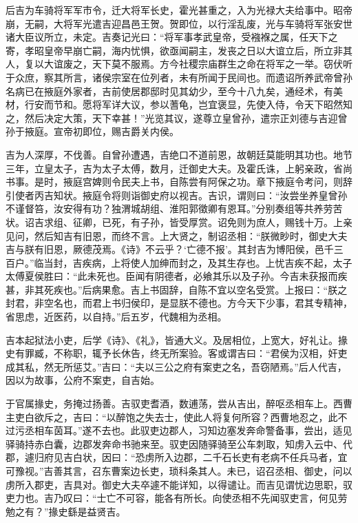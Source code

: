 \documentclass[12pt,UTF8]{ctexbook}
\begin{document}
后吉为车骑将军军市令，迁大将军长史，霍光甚重之，入为光禄大夫给事中。昭帝崩，无嗣，大将军光遣吉迎昌邑王贺。贺即位，以行淫乱废，光与车骑将军张安世诸大臣议所立，未定。吉奏记光曰：“将军事孝武皇帝，受襁褓之属，任天下之寄，孝昭皇帝早崩亡嗣，海内忧惧，欲亟闻嗣主，发丧之日以大谊立后，所立非其人，复以大谊废之，天下莫不服焉。方今社稷宗庙群生之命在将军之一举。窃伏听于众庶，察其所言，诸侯宗室在位列者，未有所闻于民间也。而遗诏所养武帝曾孙名病已在掖庭外家者，吉前使居郡邸时见其幼少，至今十八九矣，通经术，有美材，行安而节和。愿将军详大议，参以蓍龟，岂宜褒显，先使入侍，令天下昭然知之，然后决定大策，天下幸甚！”光览其议，遂尊立皇曾孙，遣宗正刘德与吉迎曾孙于掖庭。宣帝初即位，赐吉爵关内侯。



吉为人深厚，不伐善。自曾孙遭遇，吉绝口不道前恩，故朝廷莫能明其功也。地节三年，立皇太子，吉为太子太傅，数月，迁御史大夫。及霍氏诛，上躬亲政，省尚书事。是时，掖庭宫婢则令民夫上书，自陈尝有阿保之功。章下掖庭令考问，则辞引使者丙吉知状。掖庭令将则诣御史府以视吉。吉识，谓则曰：“汝尝坐养皇曾孙不谨督笞，汝安得有功？独渭城胡组、淮阳郭徵卿有恩耳。”分别奏组等共养劳苦状。诏吉求组、征卿，已死，有子孙，皆受厚赏。诏免则为庶人，赐钱十万。上亲见问，然后知吉有旧恩，而终不言。上大贤之，制诏丞相：“朕微眇时，御史大夫吉与朕有旧恩，厥德茂焉。《诗》不云乎？‘亡德不报’。其封吉为博阳侯，邑千三百户。”临当封，吉疾病，上将使人加绅而封之，及其生存也。上忧吉疾不起，太子太傅夏侯胜曰：“此未死也。臣闻有阴德者，必飨其乐以及子孙。今吉未获报而疾甚，非其死疾也。”后病果愈。吉上书固辞，自陈不宜以空名受赏。上报曰：“朕之封君，非空名也，而君上书归侯印，是显朕不德也。方今天下少事，君其专精神，省思虑，近医药，以自持。”后五岁，代魏相为丞相。



吉本起狱法小吏，后学《诗》、《礼》，皆通大义。及居相位，上宽大，好礼让。掾史有罪臧，不称职，辄予长休告，终无所案验。客或谓吉曰：“君侯为汉相，奸吏成其私，然无所惩艾。”吉曰：“夫以三公之府有案吏之名，吾窃陋焉。”后人代吉，因以为故事，公府不案吏，自吉始。



于官属掾史，务掩过扬善。吉驭吏耆酒，数逋荡，尝从吉出，醉呕丞相车上。西曹主吏白欲斥之，吉曰：“以醉饱之失去士，使此人将复何所容？西曹地忍之，此不过污丞相车茵耳。”遂不去也。此驭吏边郡人，习知边塞发奔命警备事，尝出，适见驿骑持赤白囊，边郡发奔命书驰来至。驭吏因随驿骑至公车刺取，知虏入云中、代郡，遽归府见吉白状，因曰：“恐虏所入边郡，二千石长吏有老病不任兵马者，宜可豫视。”吉善其言，召东曹案边长吏，琐科条其人。未已，诏召丞相、御史，问以虏所入郡吏，吉具对。御史大夫卒遽不能详知，以得谴让。而吉见谓忧边思职，驭吏力也。吉乃叹曰：“士亡不可容，能各有所长。向使丞相不先闻驭吏言，何见劳勉之有？”掾史繇是益贤吉。
\end{document}

